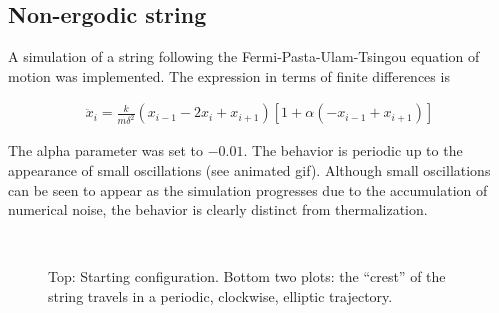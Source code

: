 \documentclass[12pt]{article}
\begin{document}
\subsection{Non-ergodic string}

A simulation of a string following the Fermi-Pasta-Ulam-Tsingou equation of
motion was implemented. The expression in terms of finite differences is

\begin{align}
  \ddot{x}_i = \frac{k}{m \delta^2}\left(x_{i - 1} - 2x_i + x_{i + 1}\right)
  \left[1 + \alpha\left(-x_{i - 1} + x_{i + 1}\right)\right]
\end{align}

The alpha parameter was set to $-0.01$. The behavior is periodic up to the
appearance of small oscillations (see animated gif).
Although small oscillations can be seen
to appear as the simulation progresses due to the accumulation of numerical
noise, the behavior is clearly distinct from thermalization.

\begin{figure}[H]
   \\
  \caption{Top: Starting configuration. Bottom two plots: the ``crest'' of the
    string travels in a periodic, clockwise, elliptic trajectory.}
\end{figure}
\end{document}

